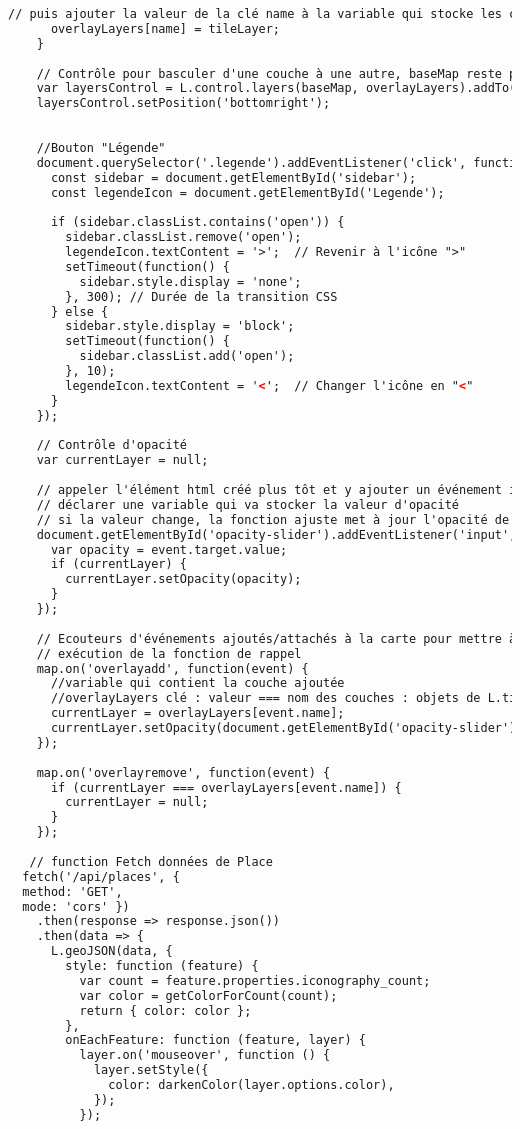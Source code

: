 \begin{lstlisting}[language=HTML, caption=Script JavaScript]
      // puis ajouter la valeur de la clé name à la variable qui stocke les couches overlayLayers
      overlayLayers[name] = tileLayer;
    }
    
    // Contrôle pour basculer d'une couche à une autre, baseMap reste par défaut et s'y ajoute les overlayLayers
    var layersControl = L.control.layers(baseMap, overlayLayers).addTo(map);
    layersControl.setPosition('bottomright');
    
   
    //Bouton "Légende"
    document.querySelector('.legende').addEventListener('click', function() {
      const sidebar = document.getElementById('sidebar');
      const legendeIcon = document.getElementById('Legende');
      
      if (sidebar.classList.contains('open')) {
        sidebar.classList.remove('open');
        legendeIcon.textContent = '>';  // Revenir à l'icône ">"
        setTimeout(function() {
          sidebar.style.display = 'none';
        }, 300); // Durée de la transition CSS
      } else {
        sidebar.style.display = 'block';
        setTimeout(function() {
          sidebar.classList.add('open');
        }, 10);
        legendeIcon.textContent = '<';  // Changer l'icône en "<"
      }
    });
    
    // Contrôle d'opacité
    var currentLayer = null;
    
    // appeler l'élément html créé plus tôt et y ajouter un événement input
    // déclarer une variable qui va stocker la valeur d'opacité
    // si la valeur change, la fonction ajuste met à jour l'opacité de la layer en cours d'utilisation
    document.getElementById('opacity-slider').addEventListener('input', function(event) {
      var opacity = event.target.value;
      if (currentLayer) {
        currentLayer.setOpacity(opacity);
      }
    });
    
    // Ecouteurs d'événements ajoutés/attachés à la carte pour mettre à jour (ajouter ou supprimer) le layer
    // exécution de la fonction de rappel
    map.on('overlayadd', function(event) {
      //variable qui contient la couche ajoutée
      //overlayLayers clé : valeur === nom des couches : objets de L.tileLayer
      currentLayer = overlayLayers[event.name];
      currentLayer.setOpacity(document.getElementById('opacity-slider').value);
    });
    
    map.on('overlayremove', function(event) {
      if (currentLayer === overlayLayers[event.name]) {
        currentLayer = null;
      }
    });
   
   // function Fetch données de Place
  fetch('/api/places', {
  method: 'GET',
  mode: 'cors' })
    .then(response => response.json())
    .then(data => {
      L.geoJSON(data, {
        style: function (feature) {
          var count = feature.properties.iconography_count;
          var color = getColorForCount(count);
          return { color: color };
        },
        onEachFeature: function (feature, layer) {
          layer.on('mouseover', function () {
            layer.setStyle({
              color: darkenColor(layer.options.color),
            });
          });


\end{lstlisting}
